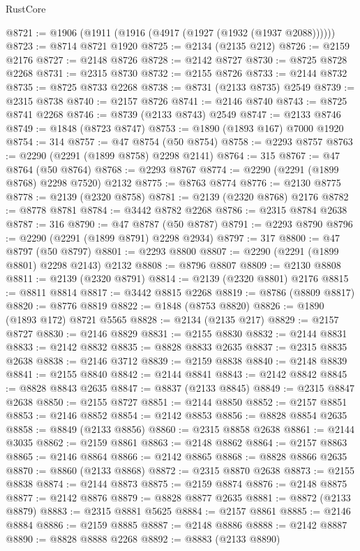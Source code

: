 \begin{lexlean}{RustCore}
\begin{coremodule}
@8721 := @1906 (@1911 (@1916 (@4917 (@1927 (@1932 (@1937 @2088))))))
@8723 := @8714 @8721 @1920
@8725 := @2134 (@2135 @212)
@8726 := @2159 @2176
@8727 := @2148 @8726
@8728 := @2142 @8727
@8730 := @8725 @8728 @2268
@8731 := @2315 @8730
@8732 := @2155 @8726
@8733 := @2144 @8732
@8735 := @8725 @8733 @2268
@8738 := @8731 (@2133 @8735) @2549
@8739 := @2315 @8738
@8740 := @2157 @8726
@8741 := @2146 @8740
@8743 := @8725 @8741 @2268
@8746 := @8739 (@2133 @8743) @2549
@8747 := @2133 @8746
@8749 := @1848 (@8723 @8747)
@8753 := @1890 (@1893 @167) @7000 @1920
@8754 := 314
@8757 := @47 @8754 (@50 @8754)
@8758 := @2293 @8757
@8763 := @2290 (@2291 (@1899 @8758) @2298 @2141)
@8764 := 315
@8767 := @47 @8764 (@50 @8764)
@8768 := @2293 @8767
@8774 := @2290 (@2291 (@1899 @8768) @2298 @7520) @2132
@8775 := @8763 @8774
@8776 := @2130 @8775
@8778 := @2139 (@2320 @8758)
@8781 := @2139 (@2320 @8768) @2176
@8782 := @8778 @8781
@8784 := @3442 @8782 @2268
@8786 := @2315 @8784 @2638
@8787 := 316
@8790 := @47 @8787 (@50 @8787)
@8791 := @2293 @8790
@8796 := @2290 (@2291 (@1899 @8791) @2298 @2934)
@8797 := 317
@8800 := @47 @8797 (@50 @8797)
@8801 := @2293 @8800
@8807 := @2290 (@2291 (@1899 @8801) @2298 @2143) @2132
@8808 := @8796 @8807
@8809 := @2130 @8808
@8811 := @2139 (@2320 @8791)
@8814 := @2139 (@2320 @8801) @2176
@8815 := @8811 @8814
@8817 := @3442 @8815 @2268
@8819 := @8786 (@8809 @8817)
@8820 := @8776 @8819
@8822 := @1848 (@8753 @8820)
@8826 := @1890 (@1893 @172) @8721 @5565
@8828 := @2134 (@2135 @217)
@8829 := @2157 @8727
@8830 := @2146 @8829
@8831 := @2155 @8830
@8832 := @2144 @8831
@8833 := @2142 @8832
@8835 := @8828 @8833 @2635
@8837 := @2315 @8835 @2638
@8838 := @2146 @3712
@8839 := @2159 @8838
@8840 := @2148 @8839
@8841 := @2155 @8840
@8842 := @2144 @8841
@8843 := @2142 @8842
@8845 := @8828 @8843 @2635
@8847 := @8837 (@2133 @8845)
@8849 := @2315 @8847 @2638
@8850 := @2155 @8727
@8851 := @2144 @8850
@8852 := @2157 @8851
@8853 := @2146 @8852
@8854 := @2142 @8853
@8856 := @8828 @8854 @2635
@8858 := @8849 (@2133 @8856)
@8860 := @2315 @8858 @2638
@8861 := @2144 @3035
@8862 := @2159 @8861
@8863 := @2148 @8862
@8864 := @2157 @8863
@8865 := @2146 @8864
@8866 := @2142 @8865
@8868 := @8828 @8866 @2635
@8870 := @8860 (@2133 @8868)
@8872 := @2315 @8870 @2638
@8873 := @2155 @8838
@8874 := @2144 @8873
@8875 := @2159 @8874
@8876 := @2148 @8875
@8877 := @2142 @8876
@8879 := @8828 @8877 @2635
@8881 := @8872 (@2133 @8879)
@8883 := @2315 @8881 @5625
@8884 := @2157 @8861
@8885 := @2146 @8884
@8886 := @2159 @8885
@8887 := @2148 @8886
@8888 := @2142 @8887
@8890 := @8828 @8888 @2268
@8892 := @8883 (@2133 @8890)

\end{coremodule}
\end{lexlean}
